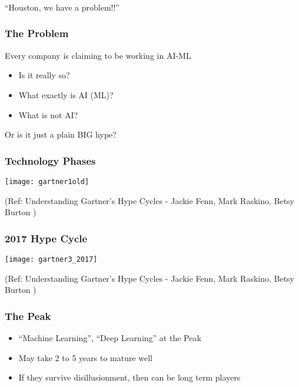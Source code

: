 \begin{frame}[fragile]\frametitle{}
\begin{center}
{\Large ``Houston, we have a problem!!''}
\end{center}
\end{frame}

\begin{frame}[fragile]\frametitle{The Problem}
Every company is claiming to be working in AI-ML
\begin{itemize}
\item Is it really so?
\item What exactly is AI (ML)?
\item What is not AI?
\end{itemize}
Or is it just a plain BIG hype?
\end{frame}


\begin{frame}[fragile]\frametitle{Technology Phases}
\begin{center}
\texttt{[image: gartner1old]}
\end{center}
{\tiny (Ref: Understanding Gartner's Hype Cycles - Jackie Fenn, Mark Raskino, Betsy Burton )}
\end{frame}

\begin{frame}[fragile]\frametitle{2017 Hype Cycle}
\begin{center}
\texttt{[image: gartner3\_2017]}
\end{center}
{\tiny (Ref: Understanding Gartner's Hype Cycles - Jackie Fenn, Mark Raskino, Betsy Burton )}
\end{frame}


\begin{frame}[fragile]\frametitle{The Peak}
\begin{itemize}
\item ``Machine Learning'', ``Deep Learning'' at the Peak
\item May take 2 to 5 years to mature well
\item If they survive disillusionment, then can be long term players
\end{itemize}
\end{frame}


